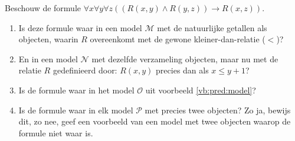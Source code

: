  \begin{exercise}
 Beschouw de formule $\forall x\forall y\forall z((R(x,y)\wedge R(y,z))\rightarrow R(x,z))$.
 \begin{enumerate}
     \item Is deze formule waar in een model $\mathcal M$ met de natuurlijke getallen als objecten, waarin $R$ overeenkomt met de gewone kleiner-dan-relatie ($<$)?
     \item En in een model $\mathcal N$ met dezelfde verzameling objecten, maar nu met de relatie $R$ gedefinieerd door: $R(x, y)$ precies dan als $x\leq y+1$?
     \item Is de formule waar in het model $\mathcal O$ uit voorbeeld \ref{vb:pred:model}?
     \item Is de formule waar in elk model $\mathcal P$ met precies twee objecten? Zo ja, bewijs dit, zo nee, geef een voorbeeld van een model met twee objecten waarop de formule niet waar is.
 \end{enumerate}
 \end{exercise}
 
